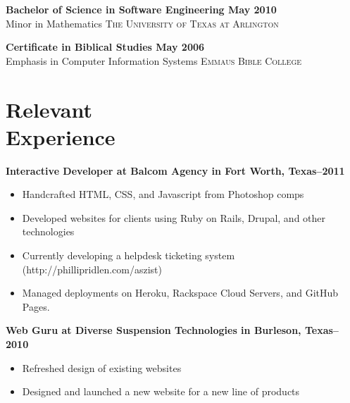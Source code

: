 \documentclass[margin]{res}
\newcommand{\sectionspace}{\vspace{10pt}}
\begin{document}
\begin{resume}
                \textbf{Bachelor of Science in Software Engineering \dotfill May 2010 }  \\
                Minor in Mathematics \hfill \textsc{The University of Texas at Arlington}

                \textbf{Certificate in Biblical Studies \dotfill May 2006 }  \\
                Emphasis in Computer Information Systems \hfill \textsc{Emmaus Bible College}

\sectionspace


\section{
Relevant \\ Experience}

              
                \textbf{Interactive Developer
                 at Balcom Agency in Fort Worth, Texas--2011}
                 \vspace{-10pt}\begin{itemize} \itemsep -2pt %
                   \item Handcrafted HTML, CSS, and Javascript from Photoshop comps
                 
                   \item Developed websites for clients using Ruby on Rails, Drupal, and other technologies
                 
                   \item Currently developing a helpdesk ticketing system (http://phillipridlen.com/aszist)
                 
                   \item Managed deployments on Heroku, Rackspace Cloud Servers, and GitHub Pages.
                 \end{itemize}
              
                \textbf{Web Guru
                 at Diverse Suspension Technologies in Burleson, Texas--2010}
                 \vspace{-10pt}\begin{itemize} \itemsep -2pt %
                   \item Refreshed design of existing websites
                 
                   \item Designed and launched a new website for a new line of products
                 \end{itemize}
              

\end{resume}
\end{document}
